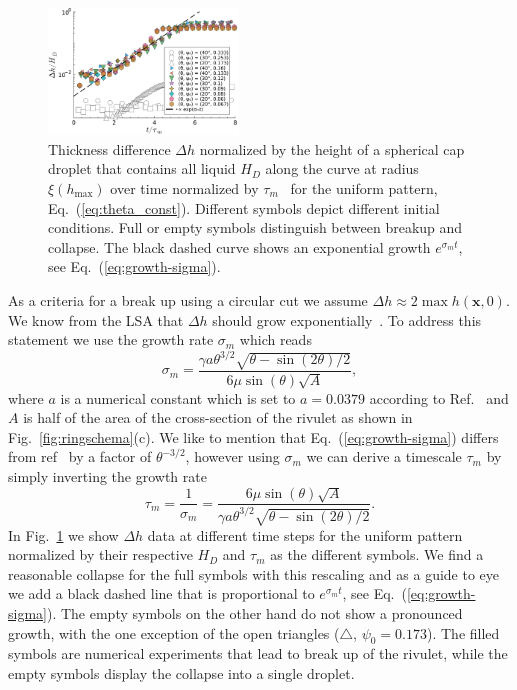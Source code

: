 \documentclass[twoside,twocolumn,9pt]{article}
\begin{document}
\begin{figure}
    \centering
    \includegraphics[width=0.45\textwidth]{assets/growth-breakup.pdf}
    \caption{Thickness difference $\Delta h$ normalized by the height of a spherical cap droplet that contains all liquid $H_D$ along the curve at radius $\xi(h_{\max})$ over time normalized by $\tau_{m}$~\cite{wuBreakupPatternedNanoscale2010} for the uniform pattern, Eq.~(\ref{eq:theta_const}). 
    Different symbols depict different initial conditions. 
    Full or empty symbols distinguish between breakup and collapse. 
    The black dashed curve shows an exponential growth $e^{\sigma_m t}$, see Eq.~(\ref{eq:growth-sigma}).
    }
    \label{fig:first_growth}
\end{figure}
As a criteria for a break up using a circular cut we assume $\Delta h \approx 2\max{h(\mathbf{x},0)}$. 
We know from the LSA that $\Delta h$ should grow exponentially~\cite{wuBreakupPatternedNanoscale2010, gonzalezStabilityLiquidRing2013, nguyenCompetitionCollapseBreakup2012}.
To address this statement we use the growth rate $\sigma_m$ which reads
\begin{equation}\label{eq:growth-sigma}
    \sigma_m = \frac{\gamma a \theta^{3/2}\sqrt{\theta - \sin(2\theta)/2}}{6\mu\sin(\theta)\sqrt{A}}, 
\end{equation}
where $a$ is a numerical constant which is set to $a = 0.0379$ according to Ref.~\cite{wuBreakupPatternedNanoscale2010, diezBreakupFluidRivulets2009} and $A$ is half of the area of the cross-section of the rivulet as shown in Fig.~\ref{fig:ringschema}(c).
We like to mention that Eq.~(\ref{eq:growth-sigma}) differs from ref~\cite{wuBreakupPatternedNanoscale2010} by a factor of $\theta^{-3/2}$, however using $\sigma_m$ we can derive a timescale $\tau_m$ by simply inverting the growth rate  
\begin{equation}\label{eq:tau_m}
    \tau_{m} = \frac{1}{\sigma_m} = \frac{6\mu\sin(\theta)\sqrt{A}}{\gamma a \theta^{3/2}\sqrt{\theta - \sin(2\theta)/2}}.      
\end{equation}
In Fig.~\ref{fig:first_growth} we show $\Delta h$ data at different time steps for the uniform pattern normalized by their respective $H_D$ and $\tau_m$ as the different symbols.  
We find a reasonable collapse for the full symbols with this rescaling and as a guide to eye we add a black dashed line that is proportional to $e^{\sigma_m t}$, see Eq.~(\ref{eq:growth-sigma}). 
The empty symbols on the other hand do not show a pronounced growth, with the one exception of the open triangles ($\triangle$, $\psi_0 = 0.173$). 
The filled symbols are numerical experiments that lead to break up of the rivulet, while the empty symbols display the collapse into a single droplet.
\end{document}
